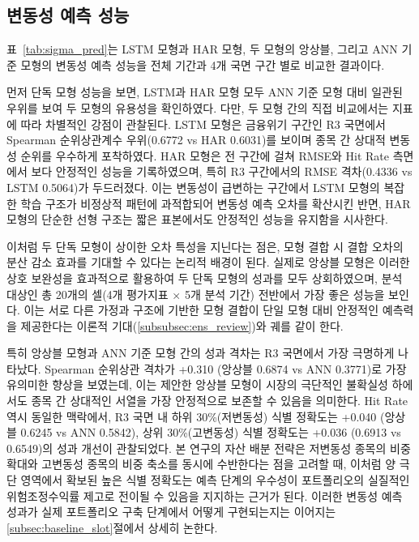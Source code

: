 \documentclass{article}
\begin{document}
\subsection{변동성 예측 성능}\label{subsec:vol_pred_eval}

표~\ref{tab:sigma_pred}는 LSTM 모형과 HAR 모형, 두 모형의 앙상블, 그리고 ANN 기준 모형의 변동성 예측 성능을 전체 기간과 4개 국면 구간 별로 비교한 결과이다.

먼저 단독 모형 성능을 보면, LSTM과 HAR 모형 모두 ANN 기준 모형 대비 일관된 우위를 보여 두 모형의 유용성을 확인하였다. 다만, 두 모형 간의 직접 비교에서는 지표에 따라 차별적인 강점이 관찰된다. LSTM 모형은 금융위기 구간인 R3 국면에서 Spearman 순위상관계수 우위(0.6772 vs HAR 0.6031)를 보이며 종목 간 상대적 변동성 순위를 우수하게 포착하였다. HAR 모형은 전 구간에 걸쳐 RMSE와 Hit Rate 측면에서 보다 안정적인 성능을 기록하였으며, 특히 R3 구간에서의 RMSE 격차(0.4336 vs LSTM 0.5064)가 두드러졌다. 이는 변동성이 급변하는 구간에서 LSTM 모형의 복잡한 학습 구조가 비정상적 패턴에 과적합되어 변동성 예측 오차를 확산시킨 반면, HAR 모형의 단순한 선형 구조는 짧은 표본에서도 안정적인 성능을 유지함을 시사한다. 

이처럼 두 단독 모형이 상이한 오차 특성을 지닌다는 점은, 모형 결합 시 결합 오차의 분산 감소 효과를 기대할 수 있다는 논리적 배경이 된다. 실제로 앙상블 모형은 이러한 상호 보완성을 효과적으로 활용하여 두 단독 모형의 성과를 모두 상회하였으며, 분석 대상인 총 20개의 셀(4개 평가지표 $\times$ 5개 분석 기간) 전반에서 가장 좋은 성능을 보인다. 이는 서로 다른 가정과 구조에 기반한 모형 결합이 단일 모형 대비 안정적인 예측력을 제공한다는 이론적 기대(\ref{subsubsec:ens_review})와 궤를 같이 한다.

특히 앙상블 모형과 ANN 기준 모형 간의 성과 격차는 R3 국면에서 가장 극명하게 나타났다. Spearman 순위상관 격차가 +0.310 (앙상블 0.6874 vs ANN 0.3771)로 가장 유의미한 향상을 보였는데, 이는 제안한 앙상블 모형이 시장의 극단적인 불확실성 하에서도 종목 간 상대적인 서열을 가장 안정적으로 보존할 수 있음을 의미한다. Hit Rate 역시 동일한 맥락에서, R3 국면 내 하위 30\%(저변동성) 식별 정확도는 +0.040 (앙상블 0.6245 vs ANN 0.5842), 상위 30\%(고변동성) 식별 정확도는 +0.036 (0.6913 vs 0.6549)의 성과 개선이 관찰되었다. 본 연구의 자산 배분 전략은 저변동성 종목의 비중 확대와 고변동성 종목의 비중 축소를 동시에 수반한다는 점을 고려할 때, 이처럼 양 극단 영역에서 확보된 높은 식별 정확도는 예측 단계의 우수성이 포트폴리오의 실질적인 위험조정수익률 제고로 전이될 수 있음을 지지하는 근거가 된다. 이러한 변동성 예측 성과가 실제 포트폴리오 구축 단계에서 어떻게 구현되는지는 이어지는 \ref{subsec:baseline_slot}절에서 상세히 논한다.
\end{document}
